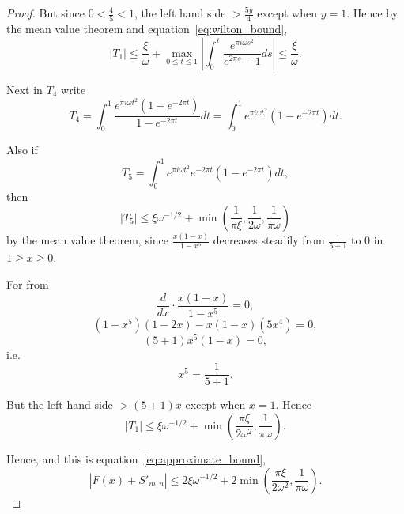 \documentclass[12pt]{article}
\theoremstyle{remark}
\begin{document}
\begin{proof}
But since $0 < \frac{4}{5} < 1$, the left hand side $> \frac{5y}{4}$ except when $y = 1$. Hence by the mean value theorem and equation~\eqref{eq:wilton_bound},
\begin{equation}\label{eq:T1_final_bound}
|T_1| \leq \frac{\xi}{\omega} + \max_{0 \leq t \leq 1} \left|\int_0^t \frac{e^{\pi i\omega s^2}}{e^{2\pi s} - 1} ds\right| \leq \frac{\xi}{\omega}.
\end{equation}

Next in $T_4$ write
\begin{equation}\label{eq:T4_decomposition}
T_4 = \int_0^1 \frac{e^{\pi i\omega t^2}(1 - e^{-2\pi t})}{1 - e^{-2\pi t}} dt = \int_0^1 e^{\pi i\omega t^2}(1 - e^{-2\pi t}) dt.
\end{equation}

Also if
\begin{equation}\label{eq:T5_definition}
T_5 = \int_0^1 e^{\pi i\omega t^2} e^{-2\pi t}(1 - e^{-2\pi t}) dt,
\end{equation}
then
\begin{equation}\label{eq:T5_bound}
|T_5| \leq \xi\omega^{-1/2} + \min\left(\frac{1}{\pi\xi}, \frac{1}{2\omega}, \frac{1}{\pi\omega}\right)
\end{equation}
by the mean value theorem, since $\frac{x(1-x)}{1-x^5}$ decreases steadily from $\frac{1}{5+1}$ to $0$ in $1 \geq x \geq 0$.

For from
\begin{equation}\label{eq:derivative_x}
\frac{d}{dx} \cdot \frac{x(1-x)}{1-x^5} = 0,
\end{equation}
\begin{equation}\label{eq:expanded_derivative}
(1-x^5)(1 - 2x) - x(1-x)(5x^4) = 0,
\end{equation}
\begin{equation}\label{eq:final_condition}
(5+1)x^5(1-x) = 0,
\end{equation}
i.e.
\begin{equation}\label{eq:simplified_final}
x^5 = \frac{1}{5+1}.
\end{equation}

But the left hand side $> (5+1)x$ except when $x = 1$. Hence
\begin{equation}\label{eq:combined_T_bounds}
|T_1| \leq \xi\omega^{-1/2} + \min\left(\frac{\pi\xi}{2\omega^2}, \frac{1}{\pi\omega}\right).
\end{equation}

Hence, and this is equation~\eqref{eq:approximate_bound},
\begin{equation}\label{eq:final_approximation}
|F(x) + S'_{m,n}| \leq 2\xi\omega^{-1/2} + 2\min\left(\frac{\pi\xi}{2\omega^2}, \frac{1}{\pi\omega}\right).
\end{equation}


\end{proof}
\end{document}
